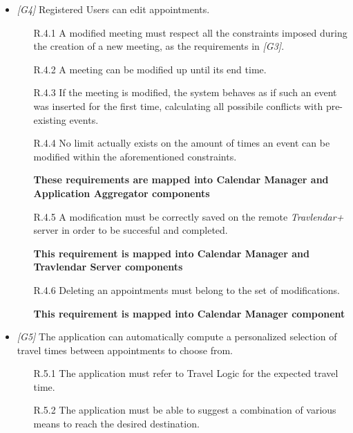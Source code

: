 \begin{itemize}
	\item \textit{[G4]} Registered Users can edit appointments.

		 \begin{itemize}

		 	\item  [R.4.1] A modified meeting must respect all the constraints imposed during the creation of a new meeting, as the requirements in \textit{[G3]}.

		 	\item [R.4.2] A meeting can be modified up until its end time.

		 	\item [R.4.3] If the meeting is modified, the system behaves as if such an event was inserted for the first time, calculating all possibile conflicts with pre-existing events.

		 	\item [R.4.4] No limit actually exists on the amount of times an event can be modified within the aforementioned constraints.
		 	
		 	\textbf{These requirements are mapped into Calendar Manager and Application Aggregator components}

		 	\item [R.4.5] A modification must be correctly saved on the remote \textit{Travlendar+} server in order to be succesful and completed.

			\textbf{This requirement is mapped into Calendar Manager and Travlendar Server components}
			
		 	\item [R.4.6] Deleting an appointments must belong to the set of modifications.
		 	
		 		\textbf{This requirement is mapped into Calendar Manager component}

		 \end{itemize}





	\item \textit{[G5]} The application can automatically compute a personalized selection of travel times between appointments to choose from.

		\begin{itemize}

			\item [R.5.1] The application must refer to Travel Logic for the expected travel time.

			\item [R.5.2] The application must be able to suggest a combination of various means to reach the desired destination.


\end{itemize}
\end{itemize}
